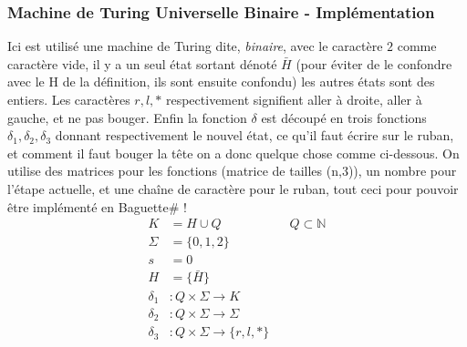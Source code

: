 \documentclass{beamer}
\newcommand{\bsf}{Baguette\# }
\begin{document}
    \begin{frame}[allowframebreaks]
        \frametitle{Machine de Turing Universelle Binaire - Implémentation}
        Ici est utilisé une machine de Turing dite, \textit{binaire}, avec le caractère $2$ comme caractère vide, 
        il y a un seul état sortant dénoté $\bar{H}$ (pour éviter de le confondre avec le H de la définition, ils sont ensuite confondu) 
        les autres états sont des entiers. 
        Les caractères $r,l,*$ respectivement signifient aller à droite, aller à gauche, et ne pas bouger.
        Enfin la fonction $\delta$ est découpé en trois fonctions $\delta_1,\delta_2,\delta_3$ donnant respectivement 
        le nouvel état, ce qu'il faut écrire sur le ruban, et comment il faut bouger la tête
         on a donc quelque chose comme ci-dessous. 
         On utilise des matrices pour les fonctions (matrice de tailles (n,3)), un nombre pour l'étape actuelle, et une chaîne de caractère pour le ruban,
         tout ceci pour pouvoir être implémenté en \bsf!
        \begin{align*}
            K &= H \cup Q && Q \subset \mathbb{N} \\
            \Sigma &= \{0,1,2\} \\ 
            s &= 0 \\ 
            H &= \{\bar{H}\} \\ 
            \delta_1 &: Q \times \Sigma \to K \\ 
            \delta_2 &: Q \times \Sigma \to \Sigma \\ 
            \delta_3 &: Q \times \Sigma \to \{r,l,*\}
        \end{align*}
    \end{frame}
\end{document}
